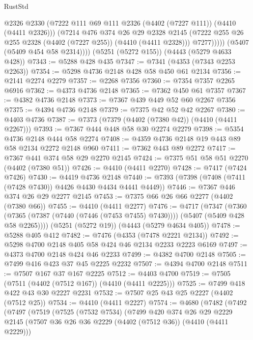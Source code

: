 \begin{lexlean}{RustStd}
\begin{coremodule}
                @2326
                @2330
                (@7222 @111 @69 @111 @2326 (@4402 (@7227 @111)) (@4410 (@4411 @2326)))
                (@7214
                  @476
                  @374
                  @26
                  @29
                  @2328
                  @2145
                  (@7222 @255 @26 @255 @2328 (@4402 (@7227 @255)) (@4410 (@4411 @2328)))
                  @7277)))))
        (@5407 (@5409 @454 @58 @2314))))
    (@5251 (@5272 @155))
    (@4443 (@5279 @4633 @428))
@7343 := @5288 @428 @435
@7347 := @7341 (@4353 (@7343 @2253 @2263))
@7354 := @5298 @4736 @2148 @428 @58 @450 @61 @2134
@7356 := @2141 @2274 @2279
@7357 := @2268 @7356
@7360 := @7354 @7357 @2265 @6916
@7362 := @4373 @4736 @2148
@7365 := @7362 @450 @61 @7357
@7367 := @4382 @4736 @2148
@7373 := @7367 @439 @449 @52 @60 @2267 @7356
@7375 := @4394 @4736 @2148
@7379 := @7375 @42 @52 @42 @2267
@7380 := @4403 @4736
@7387 := @7373 (@7379 (@4402 (@7380 @42)) (@4410 (@4411 @2267)))
@7393 := @7367 @444 @448 @58 @30 @2274 @2279
@7398 := @5354 @4736 @2148 @444 @58 @2274
@7408 := @4359 @4736 @2148 @19 @443 @89 @58 @2134 @2272 @2148 @960
@7411 := @7362 @443 @89 @2272
@7417 := @7367 @441 @374 @58 @29 @2270 @2145
@7424 := @7375 @51 @58 @51 @2270 (@4402 (@7380 @51))
@7426 := @4410 (@4411 @2270)
@7428 := @7417 (@7424 @7426)
@7430 := @4419 @4736 @2148
@7440 := @7393 (@7398 (@7408 (@7411 (@7428 @7430)) @4426 @4430 @4434 @4441 @4449))
@7446 := @7367 @446 @374 @26 @29 @2277 @2145
@7453 := @7375 @66 @26 @66 @2277 (@4402 (@7380 @66))
@7455 := @4410 (@4411 @2277)
@7476 := @4717
    (@7347
      (@7360 (@7365 (@7387 (@7440 (@7446 (@7453 @7455) @7430)))) (@5407 (@5409 @428 @58 @2265))))
    (@5251 (@5272 @19))
    (@4443 (@5279 @4634 @405))
@7478 := @5288 @405 @412
@7482 := @7476 (@4353 (@7478 @2221 @2134))
@7492 := @5298 @4700 @2148 @405 @58 @424 @46 @2134 @2233 @2223 @6169
@7497 := @4373 @4700 @2148 @424 @46 @2233
@7499 := @4382 @4700 @2148
@7505 := @7499 @416 @423 @37 @45 @2225 @2232
@7507 := @4394 @4700 @2148
@7511 := @7507 @167 @37 @167 @2225
@7512 := @4403 @4700
@7519 := @7505 (@7511 (@4402 (@7512 @167)) (@4410 (@4411 @2225)))
@7525 := @7499 @418 @422 @43 @30 @2227 @2231
@7532 := @7507 @25 @43 @25 @2227 (@4402 (@7512 @25))
@7534 := @4410 (@4411 @2227)
@7574 := @4680
    (@7482
      (@7492
        (@7497
          (@7519
            (@7525
              (@7532 @7534)
              (@7499
                @420
                @374
                @26
                @29
                @2229
                @2145
                (@7507 @36 @26 @36 @2229 (@4402 (@7512 @36)) (@4410 (@4411 @2229)))

\end{coremodule}
\end{lexlean}
